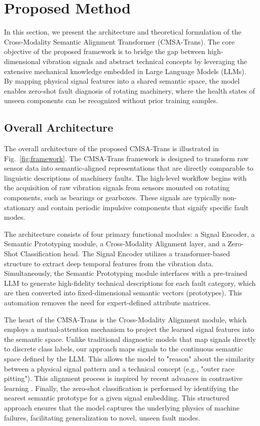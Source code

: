 \section{Proposed Method}
In this section, we present the architecture and theoretical formulation of the Cross-Modality Semantic Alignment Transformer (CMSA-Trans). The core objective of the proposed framework is to bridge the gap between high-dimensional vibration signals and abstract technical concepts by leveraging the extensive mechanical knowledge embedded in Large Language Models (LLMs). By mapping physical signal features into a shared semantic space, the model enables zero-shot fault diagnosis of rotating machinery, where the health states of unseen components can be recognized without prior training samples.

\subsection{Overall Architecture}
The overall architecture of the proposed CMSA-Trans is illustrated in Fig.~\ref{fig:framework}. The CMSA-Trans framework is designed to transform raw sensor data into semantic-aligned representations that are directly comparable to linguistic descriptions of machinery faults. The high-level workflow begins with the acquisition of raw vibration signals from sensors mounted on rotating components, such as bearings or gearboxes. These signals are typically non-stationary and contain periodic impulsive components that signify specific fault modes.

The architecture consists of four primary functional modules: a Signal Encoder, a Semantic Prototyping module, a Cross-Modality Alignment layer, and a Zero-Shot Classification head. The Signal Encoder utilizes a transformer-based structure \cite{vaswani2017attention, zerveas2021transformer} to extract deep temporal features from the vibration data. Simultaneously, the Semantic Prototyping module interfaces with a pre-trained LLM \cite{radford2021learning} to generate high-fidelity technical descriptions for each fault category, which are then converted into fixed-dimensional semantic vectors (prototypes). This automation removes the need for expert-defined attribute matrices.

The heart of the CMSA-Trans is the Cross-Modality Alignment module, which employs a mutual-attention mechanism to project the learned signal features into the semantic space. Unlike traditional diagnostic models that map signals directly to discrete class labels, our approach maps signals to the continuous semantic space defined by the LLM. This allows the model to "reason" about the similarity between a physical signal pattern and a technical concept (e.g., "outer race pitting"). This alignment process is inspired by recent advances in contrastive learning \cite{radford2021learning, oord2018representation, chen2020simple}. Finally, the zero-shot classification is performed by identifying the nearest semantic prototype for a given signal embedding. This structured approach ensures that the model captures the underlying physics of machine failures, facilitating generalization to novel, unseen fault modes.

